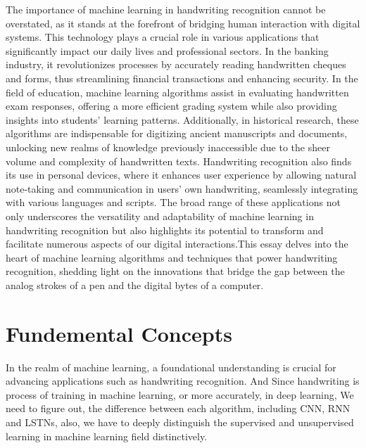 \documentclass[12pt]{article}
\begin{document}
The importance of machine learning in handwriting recognition cannot be overstated, as it stands at the forefront of bridging human interaction with digital systems. This technology plays a crucial role in various applications that significantly impact our daily lives and professional sectors. In the banking industry, it revolutionizes processes by accurately reading handwritten cheques and forms, thus streamlining financial transactions and enhancing security. In the field of education, machine learning algorithms assist in evaluating handwritten exam responses, offering a more efficient grading system while also providing insights into students' learning patterns. Additionally, in historical research, these algorithms are indispensable for digitizing ancient manuscripts and documents, unlocking new realms of knowledge previously inaccessible due to the sheer volume and complexity of handwritten texts. Handwriting recognition also finds its use in personal devices, where it enhances user experience by allowing natural note-taking and communication in users' own handwriting, seamlessly integrating with various languages and scripts. The broad range of these applications not only underscores the versatility and adaptability of machine learning in handwriting recognition but also highlights its potential to transform and facilitate numerous aspects of our digital interactions.This essay delves into the heart of machine learning algorithms and techniques that power handwriting recognition, shedding light on the innovations that bridge the gap between the analog strokes of a pen and the digital bytes of a computer.

\section* {Fundemental Concepts}
In the realm of machine learning, a foundational understanding is crucial for advancing applications such as handwriting recognition. And Since handwriting is process of training in machine learning, or more accurately, in deep learning, We need to figure out, the difference between each algorithm, including CNN, RNN and LSTNs, also, we have to deeply distinguish the supervised and unsupervised learning in machine learning field distinctively.
\end{document}
